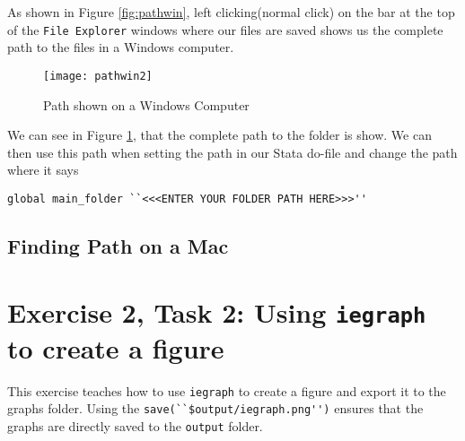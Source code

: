 \documentclass[]{article}
\begin{document}
As shown in Figure \ref{fig:pathwin}, left clicking(normal click) on the bar at the top of the \texttt{File Explorer} windows where our files are saved shows us the complete path to the files in a Windows computer. \\

\begin{figure}[H]
	\centering
	\texttt{[image: pathwin2]}
	\caption{Path shown on a Windows Computer}
	\label{fig:pathwin2}
\end{figure}

We can see in Figure \ref{fig:pathwin2}, that the complete path to the folder is show. We can then use this path when setting the path in our Stata do-file and change the path where it says \begin{verbatim}
global main_folder ``<<<ENTER YOUR FOLDER PATH HERE>>>''
\end{verbatim} 

\subsection*{Finding Path on a Mac}

\section*{Exercise 2, Task 2: Using \texttt{iegraph} to create a figure}

This exercise teaches how to use \texttt{iegraph} to create a figure and export it to the graphs folder. Using the \verb|save(``$output/iegraph.png'')| ensures that the graphs are directly saved to the \texttt{output} folder. 

\section*{}
	
\end{document}
